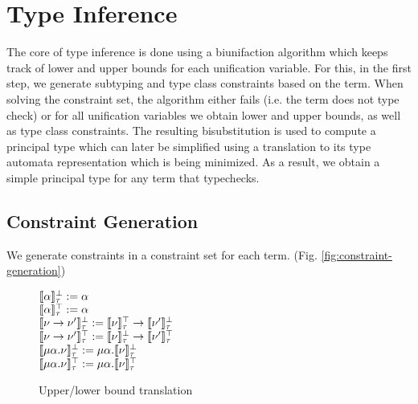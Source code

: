 \section{Type Inference}
\label{sec:type-inference}

The core of type inference is done using a biunifaction algorithm which keeps track of lower and upper bounds for each unification variable.
For this, in the first step, we generate subtyping and type class constraints based on the term.
When solving the constraint set, the algorithm either fails (i.e. the term does not type check) or for all unification variables we obtain lower and upper bounds, as well as type class constraints.
The resulting bisubstitution is used to compute a principal type which can later be simplified using a translation to its type automata representation which is being minimized.
As a result, we obtain a simple principal type for any term that typechecks.

\cite{binder22refinement}

\subsection{Constraint Generation}

We generate constraints in a constraint set for each term. (Fig. \ref{fig:constraint-generation})


\begin{figure}[ht]
    \begin{center}
        $\llbracket \alpha \rrbracket_\tau^\bot := \alpha$ \\
        $\llbracket \alpha \rrbracket_\tau^\top := \alpha$ \\
        $\llbracket \nu \to \nu' \rrbracket_\tau^\bot := \llbracket \nu \rrbracket_\tau^\top \to \llbracket \nu' \rrbracket_\tau^\bot$ \\
        $\llbracket \nu \to \nu' \rrbracket_\tau^\top := \llbracket \nu \rrbracket_\tau^\bot \to \llbracket \nu' \rrbracket_\tau^\top$ \\
        $\llbracket \mu\alpha.\nu \rrbracket_\tau^\bot := \mu\alpha.\llbracket \nu \rrbracket_\tau^\bot$ \\
        $\llbracket \mu\alpha.\nu \rrbracket_\tau^\top := \mu\alpha.\llbracket \nu \rrbracket_\tau^\top$ \\
    \end{center}
    \caption{Upper/lower bound translation}
    \label{fig:bound-translation}
\end{figure}

